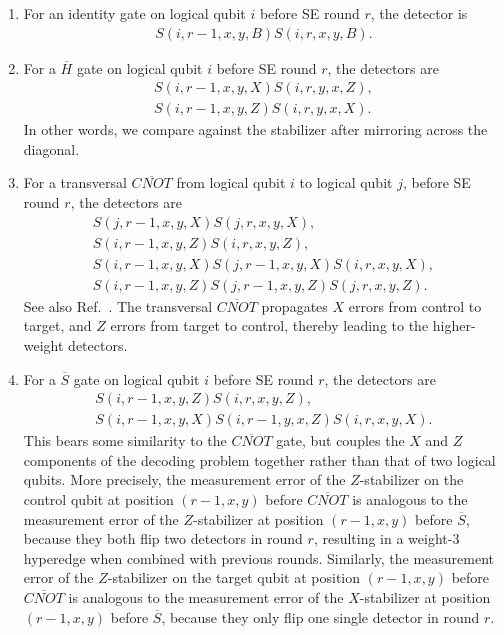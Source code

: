 \begin{enumerate}
\item For an identity gate on logical qubit $i$ before SE round $r$, the detector is
\begin{align*}
S(i,r-1,x,y,B)S(i,r,x,y,B).
\end{align*}
\item For a $\overline{H}$ gate on logical qubit $i$ before SE round $r$, the detectors are
\begin{align*}
S(i,r-1,x,y,X)S(i,r,y,x,Z),\\
S(i,r-1,x,y,Z)S(i,r,y,x,X).
\end{align*}
%
In other words, we compare against the stabilizer after mirroring across the diagonal.
\item For a transversal $\overline{CNOT}$ from logical qubit $i$ to logical qubit $j$, before SE round $r$, the detectors are
\begin{gather*}
S(j,r-1,x,y,X)S(j,r,x,y,X),\\
S(i,r-1,x,y,Z)S(i,r,x,y,Z),\\
S(i,r-1,x,y,X)S(j,r-1,x,y,X)S(i,r,x,y,X),\\
S(i,r-1,x,y,Z)S(j,r-1,x,y,Z)S(j,r,x,y,Z).
\end{gather*}
See also Ref.~\cite{cain2024correlated}. The transversal $\overline{CNOT}$ propagates $X$ errors from control to target, and $Z$ errors from target to control, thereby leading to the higher-weight detectors.
\item For a $\overline{S}$ gate on logical qubit $i$ before SE round $r$, the detectors are
\begin{gather*}
S(i,r-1,x,y,Z)S(i,r,x,y,Z),\\
S(i,r-1,x,y,X)S(i,r-1,y,x,Z)S(i,r,x,y,X).
\end{gather*}
This bears some similarity to the $\overline{CNOT}$ gate, but couples the $X$ and $Z$ components of the decoding problem together rather than that of two logical qubits. More precisely, the measurement error of the $Z$-stabilizer on the control qubit at position $(r-1, x, y)$ before $\overline{CNOT}$ is analogous to the measurement error of the $Z$-stabilizer at position $(r-1, x, y)$ before $\overline{S}$, because they both flip two detectors in round $r$, resulting in a weight-3 hyperedge when combined with previous rounds. Similarly, the measurement error of the $Z$-stabilizer on the target qubit at position $(r-1, x, y)$ before $\overline{CNOT}$ is analogous to the measurement error of the $X$-stabilizer at position $(r-1, x, y)$ before $\overline{S}$, because they only flip one single detector in round $r$.
\end{enumerate}

